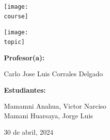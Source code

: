 \documentclass[10pt, a4paper]{article}
\newcommand{\course}{img/web_programming.png}
\newcommand{\topic}{img/docker.png}
\newcommand{\professor}{Carlo Jose Luis Corrales Delgado}
\newcommand{\students}{Mamamni Anahua, Victor Narciso \\ Mamani Huarsaya, Jorge Luis}
\newcommand{\mydate}{30 de abril, 2024}
\begin{document}
\begin{titlepage}
	\centering
	\texttt{[image: \\course]} \par
  \vfill \vfill
	\texttt{[image: \\topic]}\par
  \vfill \vfill
  {\textbf{Profesor(a):} \par}
	\professor \vfill
  {\textbf{Estudiantes:} \par}
	\students \vfill
	{\large \mydate \par}
\end{titlepage}


% 
\end{document}
